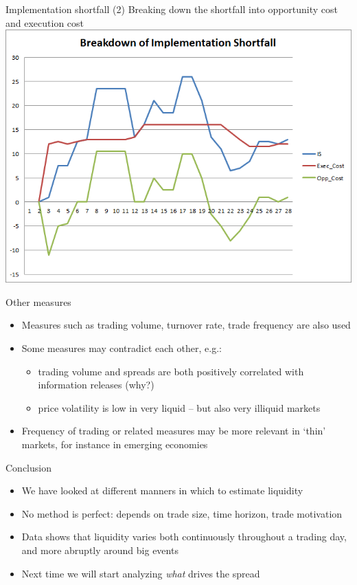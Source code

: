 \documentclass[english,10pt]{beamer}
\begin{document}
\begin{frame}{Implementation shortfall (2)}
	Breaking down the shortfall into opportunity cost and execution cost
	\center
	\includegraphics[scale=0.39]{pics/L2_is2}
\end{frame}


\begin{frame}{Other measures}
\begin{itemize}
	\item Measures such as trading volume, turnover rate, trade frequency are also used
	\item Some measures may contradict each other, e.g.:
	\begin{itemize}
		\item trading volume and spreads are both positively correlated with information releases (why?)
		\item price volatility is low in very liquid -- but also very illiquid markets
	\end{itemize}
	\item Frequency of trading or related measures may be more relevant in `thin' markets, for instance in emerging economies
\end{itemize}
\end{frame}


\begin{frame}{Conclusion}
	\begin{itemize}
		\item We have looked at different manners in which to estimate liquidity
		\item No method is perfect: depends on trade size, time horizon, trade motivation
		\item Data shows that liquidity varies both continuously throughout a trading day, and more abruptly around big events
		\item Next time we will start analyzing \textit{what} drives the spread
	\end{itemize}
\end{frame}
\end{document}
